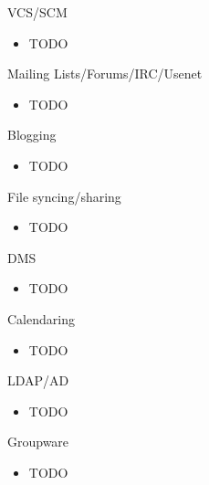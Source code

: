 \documentclass{beamer}
\begin{document}
\begin{frame}{VCS/SCM}
  \begin{itemize}
    \item TODO
  \end{itemize}
\end{frame}

\begin{frame}{Mailing Lists/Forums/IRC/Usenet}
  \begin{itemize}
    \item TODO
  \end{itemize}
\end{frame}

\begin{frame}{Blogging}
  \begin{itemize}
    \item TODO
  \end{itemize}
\end{frame}

\begin{frame}{File syncing/sharing}
  \begin{itemize}
    \item TODO
  \end{itemize}
\end{frame}

\begin{frame}{DMS}
  \begin{itemize}
    \item TODO
  \end{itemize}
\end{frame}

\begin{frame}{Calendaring}
  \begin{itemize}
    \item TODO
  \end{itemize}
\end{frame}

\begin{frame}{LDAP/AD}
  \begin{itemize}
    \item TODO
  \end{itemize}
\end{frame}

\begin{frame}{Groupware}
  \begin{itemize}
    \item TODO
  \end{itemize}
\end{frame}
\end{document}
